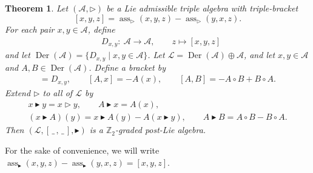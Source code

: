 \documentclass[10pt,a4paper]{amsart}
\newcommand{\Der}{\operatorname{Der}}
\newcommand{\noarg}{\,\_\,}
\numberwithin{equation}{section}
\newtheorem{Theorem}{Theorem}[section]
\begin{document}
\begin{Theorem}\label{th:pL_emb}
Let $(\mathcal{A},\rhd)$ be a Lie admissible triple algebra with triple-bracket
\[
[x,y,z] = \operatorname{ass}_{\rhd}(x,y,z) -\operatorname{ass}_{\rhd}(y,x,z).
\]
For each pair $x,y \in \mathcal{A}$, define
\begin{align*}
& D_{x,y}\colon \ \mathcal{A} \longrightarrow \mathcal{A}, \qquad
 z \longmapsto [x,y,z]
\end{align*}
and let $\Der(\mathcal{A}) = \{ D_{x,y} \mid x,y \in \mathcal{A} \}$. Let $\mathcal{L}=\Der(\mathcal{A}) \oplus \mathcal{A}$, and let $x,y \in \mathcal{A}$ and $A,B \in \Der(\mathcal{A})$. Define a bracket by
\begin{gather*}
 [x,y] = D_{x,y}, \qquad
 [A,x] = -A(x), \qquad
 [A,B] = -A \circ B + B \circ A.
\end{gather*}
Extend $\rhd$ to all of $\mathcal{L}$ by
\begin{gather*}
 x \blacktriangleright y = x \rhd y, \qquad
 A \blacktriangleright x = A(x), \\
 (x \blacktriangleright A)(y) = x \blacktriangleright A(y) - A(x\blacktriangleright y), \qquad
 A \blacktriangleright B = A \circ B - B \circ A.
\end{gather*}
Then $(\mathcal{L},[\noarg,\noarg],\blacktriangleright)$ is a $\mathbb{Z}_2$-graded post-Lie algebra.
\end{Theorem}


For the sake of convenience, we will write $\operatorname{ass}_{\blacktriangleright}(x,y,z) - \operatorname{ass}_{\blacktriangleright}(y,x,z) = [x,y,z]$.
\end{document}

